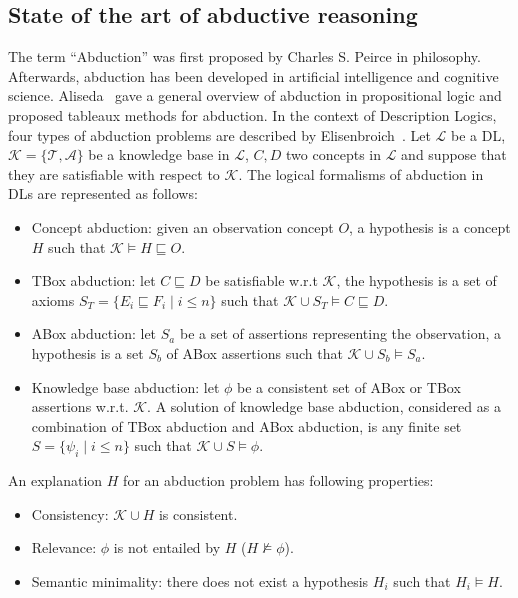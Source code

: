\documentclass{article}
\begin{document}
\subsection{State of the art of abductive reasoning}
The term ``Abduction'' was first proposed by Charles S. Peirce in philosophy.
Afterwards, abduction has been developed in artificial intelligence and cognitive science.
Aliseda~\cite{aliseda1997seeking} gave a general overview of abduction in propositional logic and proposed tableaux methods for abduction.
In the context of Description Logics, four types of abduction problems  are described by Elisenbroich~\cite{elsenbroich2006case}.
Let $\mathcal{L}$ be a DL, $\mathcal{K}=\{\mathcal{T},\mathcal{A}\}$ be a knowledge base in $\mathcal{L}$, $C,D$ two concepts in $\mathcal{L}$ and suppose that they are satisfiable
with respect to  $\mathcal{K}$.
The logical formalisms of abduction in DLs are represented as follows:
\begin{itemize}
 \item Concept abduction: given an observation concept $O$, a hypothesis is a concept $H$ such that $\mathcal{K}\vDash H \sqsubseteq O$.
 \item TBox abduction: let $C\sqsubseteq D$ be satisfiable w.r.t $\mathcal{K}$, the hypothesis is a set of axioms $S_T=\{E_i\sqsubseteq F_i \mid i\leq n\}$
 such that $ \mathcal{K}\cup S_T\vDash C\sqsubseteq D$.
 \item ABox abduction: let $S_a$ be a set of assertions representing the observation, a hypothesis is a set $S_b$ of ABox assertions such that $\mathcal{K} \cup S_b\vDash S_a$.
 \item Knowledge base abduction: let $\phi$ be a consistent set of ABox or TBox assertions w.r.t. $\mathcal{K}$. A solution of knowledge base abduction, considered 
 as a combination of TBox abduction and ABox abduction, is any finite set $S=\{\psi_i \mid i\leq n\}$ such that $ \mathcal{K} \cup S \vDash \phi$.
\end{itemize}

An explanation $H$ for an abduction problem has following properties: 
\begin{itemize}
  \item Consistency: $\mathcal{K}\cup H$ is consistent.
  \item Relevance: $\phi$ is not entailed by $H$ ($H\nvDash \phi$).
  \item Semantic minimality: there does not exist a hypothesis $H_i$ such that $H_i\vDash H$.
 \end{itemize}
\end{document}
